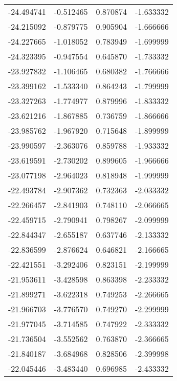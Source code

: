 \begin{tabular}{rrrr}
      -24.494741 &        -0.512465 &    0.870874 &  -1.633332 \\
      -24.215092 &        -0.879775 &    0.905904 &  -1.666666 \\
      -24.227665 &        -1.018052 &    0.783949 &  -1.699999 \\
      -24.323395 &        -0.947554 &    0.645870 &  -1.733332 \\
      -23.927832 &        -1.106465 &    0.680382 &  -1.766666 \\
      -23.399162 &        -1.533340 &    0.864243 &  -1.799999 \\
      -23.327263 &        -1.774977 &    0.879996 &  -1.833332 \\
      -23.621216 &        -1.867885 &    0.736759 &  -1.866666 \\
      -23.985762 &        -1.967920 &    0.715648 &  -1.899999 \\
      -23.990597 &        -2.363076 &    0.859788 &  -1.933332 \\
      -23.619591 &        -2.730202 &    0.899605 &  -1.966666 \\
      -23.077198 &        -2.964023 &    0.818948 &  -1.999999 \\
      -22.493784 &        -2.907362 &    0.732363 &  -2.033332 \\
      -22.266457 &        -2.841903 &    0.748110 &  -2.066665 \\
      -22.459715 &        -2.790941 &    0.798267 &  -2.099999 \\
      -22.844347 &        -2.655187 &    0.637746 &  -2.133332 \\
      -22.836599 &        -2.876624 &    0.646821 &  -2.166665 \\
      -22.421551 &        -3.292406 &    0.823151 &  -2.199999 \\
      -21.953611 &        -3.428598 &    0.863398 &  -2.233332 \\
      -21.899271 &        -3.622318 &    0.749253 &  -2.266665 \\
      -21.966703 &        -3.776570 &    0.749270 &  -2.299999 \\
      -21.977045 &        -3.714585 &    0.747922 &  -2.333332 \\
      -21.736504 &        -3.552562 &    0.763870 &  -2.366665 \\
      -21.840187 &        -3.684968 &    0.828506 &  -2.399998 \\
      -22.045446 &        -3.483440 &    0.696985 &  -2.433332 \\

\end{tabular}
